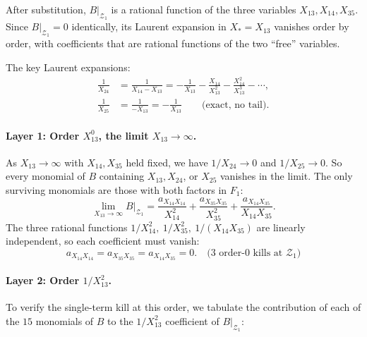 \documentclass[11pt]{article}
\newcommand{\X}[2]{X_{#1#2}}
\newcommand{\Z}{\mathcal{Z}}
\theoremstyle{definition}
\begin{document}
After substitution, $B|_{\Z_1}$ is a rational function of the three
variables $\X{1}{3}, \X{1}{4}, \X{3}{5}$. Since $B|_{\Z_1}=0$ identically,
its Laurent expansion in $X_*=\X{1}{3}$ vanishes order by order, with
coefficients that are rational functions of the two ``free'' variables.

The key Laurent expansions:
\begin{align}
\frac{1}{\X{2}{4}} &= \frac{1}{\X{1}{4}-\X{1}{3}} = -\frac{1}{\X{1}{3}}-\frac{\X{1}{4}}{\X{1}{3}^2}-\frac{\X{1}{4}^2}{\X{1}{3}^3}-\cdots,\\
\frac{1}{\X{2}{5}} &= \frac{1}{-\X{1}{3}} = -\frac{1}{\X{1}{3}}\qquad\text{(exact, no tail).}
\end{align}

\paragraph{Layer 1: Order $\X{1}{3}^0$, the limit $\X{1}{3}\to\infty$.}

As $\X{1}{3}\to\infty$ with $\X{1}{4}, \X{3}{5}$ held fixed, we have
$1/\X{2}{4}\to 0$ and $1/\X{2}{5}\to 0$. So every monomial of $B$
containing $\X{1}{3}, \X{2}{4}$, or $\X{2}{5}$ vanishes in the limit.
The only surviving monomials are those with both factors in $F_1$:
\[
\lim_{\X{1}{3}\to\infty} B|_{\Z_1} = \frac{a_{\X{1}{4}\X{1}{4}}}{\X{1}{4}^2} + \frac{a_{\X{3}{5}\X{3}{5}}}{\X{3}{5}^2} + \frac{a_{\X{1}{4}\X{3}{5}}}{\X{1}{4}\X{3}{5}}.
\]
The three rational functions $1/\X{1}{4}^2,\ 1/\X{3}{5}^2,\ 1/(\X{1}{4}\X{3}{5})$
are linearly independent, so each coefficient must vanish:
\[
\boxed{a_{\X{1}{4}\X{1}{4}}=a_{\X{3}{5}\X{3}{5}}=a_{\X{1}{4}\X{3}{5}}=0.}\quad\text{(3 order-0 kills at }\Z_1)
\]

\paragraph{Layer 2: Order $1/\X{1}{3}^2$.}

To verify the single-term kill at this order, we tabulate the contribution
of each of the $15$ monomials of $B$ to the $1/\X{1}{3}^2$ coefficient of
$B|_{\Z_1}$:
\end{document}

